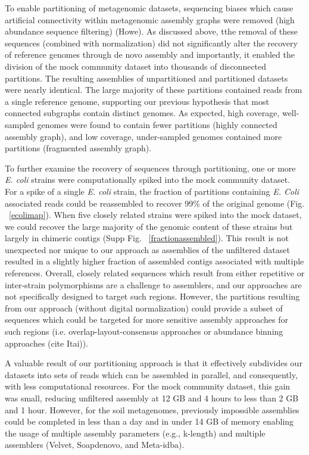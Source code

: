 \documentclass[11pt]{article} %
\begin{document}
To enable partitioning of metagenomic datasets, sequencing biases which cause artificial connectivity within metagenomic assembly graphs were removed (high abundance sequence filtering) (Howe).  As discussed above, tthe removal of these sequences (combined with normalization) did not significantly alter the recovery of reference genomes through de novo assembly and importantly, it enabled the division of the mock community dataset into thousands of disconnected partitions.  The resulting assemblies of unpartitioned and partitioned datasets were nearly identical.  The large majority of these partitions  contained reads from a single reference genome, supporting our previous hypothesis that most connected subgraphs contain distinct genomes.  As expected, high coverage, well-sampled genomes were found to contain fewer partitions (highly connected assembly graph), and low coverage, under-sampled genomes contained more partitions (fragmented assembly graph).  

To further examine the recovery of sequences through partitioning, one or more \emph{E. coli} strains were computationally spiked into the mock community dataset.  For a spike of a single \emph{E. coli} strain, the fraction of partitions containing \emph{E. Coli} associated reads could be reassembled to recover 99\% of the original genome (Fig. ~\ref{ecolimap}).  When five closely related strains were spiked into the mock dataset, we could recover the large majority of the genomic content of these strains but largely in chimeric contigs (Supp Fig. ~\ref{fractionassembled}).  This result is not unexpected nor unique to our approach as assemblies of the unfiltered dataset resulted in a slightly higher fraction of assembled contigs associated with multiple references.  Overall, closely related sequences which result from either repetitive or inter-strain polymorphisms are a challenge to assemblers, and our approaches are not specifically designed to target such regions.  However, the partitions resulting from our approach (without digital normalization) could provide a subset of sequences which could be targeted for more sensitive assembly approaches for such regions (i.e. overlap-layout-consensus approaches or abundance binning approaches (cite Itai)).  

A valuable result of our partitioning approach is that it effectively subdivides our datasets into sets of reads which can be assembled in parallel, and consequently, with less computational resources.  For the mock community dataset, this gain was small, reducing unfiltered assembly at 12 GB and 4 hours to less than 2 GB and 1 hour.  However, for the soil metagenomes, previously impossible assemblies could be completed in less than a day and in under 14 GB of memory enabling the usage of multiple assembly parameters (e.g., k-length) and multiple assemblers (Velvet, Soapdenovo, and Meta-idba).
\end{document}
